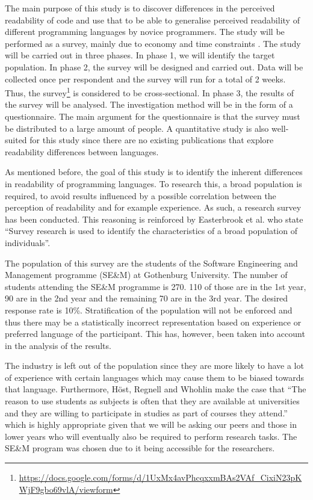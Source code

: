 \documentclass[10pt,twocolumn]{article}
\begin{document}
The main purpose of this study is to discover differences in the perceived readability of code and use that to be able to generalise perceived readability of different programming languages by novice programmers. The study will be performed as a survey, mainly due to economy and time constraints \cite{fowler2008survey}. The study will be carried out in three phases. In phase 1, we will identify the target population. In phase 2, the survey will be designed and carried out. Data will be collected once per respondent and the survey will run for a total of 2 weeks. Thus, the survey\footnote{\url{https://docs.google.com/forms/d/1UxMx4avPhcqxxmBAs2VAf_CixiN23pKWjF9gbo69vlA/viewform}} is considered to be cross-sectional. In phase 3, the results of the survey will be analysed. The investigation method will be in the form of a questionnaire. The main argument for the questionnaire is that the survey must be distributed to a large amount of people. A quantitative study is also well-suited for this study since there are no existing publications that explore readability differences between languages. 


As mentioned before, the goal of this study is to identify the inherent differences in readability of programming languages. To research this, a broad population is required, to avoid results influenced by a possible correlation between the perception of readability and for example experience. As such, a research survey has been conducted. This reasoning is reinforced by Easterbrook et al. \cite{easterbrook2008selecting} who state ``Survey research is used to identify the characteristics of a broad population of individuals''. 

The population of this survey are the students of the Software Engineering and Management programme (SE\&M) at Gothenburg University. The number of students attending the SE\&M programme is 270. 110 of those are in the 1st year, 90 are in the 2nd year and the remaining 70 are in the 3rd year. The desired response rate is 10\%. Stratification of the population will not be enforced and thus there may be a statistically incorrect representation based on experience or preferred language of the participant. This has, however, been taken into account in the analysis of the results. 

The industry is left out of the population since they are more likely to have a lot of experience with certain languages which may cause them to be biased towards that language. Furthermore, Höst, Regnell and Whohlin \cite{host2000using} make the case that ``The reason to use students as subjects is often that they are available at universities and they are willing to participate in studies as part of courses they attend.'' which is highly appropriate given that we will be asking our peers and those in lower years who will eventually also be required to perform research tasks. The SE\&M program was chosen due to it being accessible for the researchers.
\end{document}
